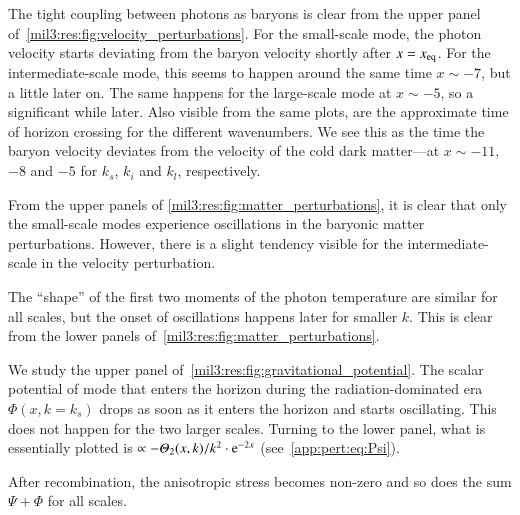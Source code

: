 





The tight coupling between photons as baryons is clear from the upper panel of~\cref{mil3:res:fig:velocity_perturbations}. For the small-scale mode, the photon velocity starts deviating from the baryon velocity shortly after $x=x_\mathrm{eq}$. For the intermediate-scale mode, this seems to happen around the same time $x\sim-7$, but a little later on. The same happens for the large-scale mode at $x\sim -5$, so a significant while later. Also visible from the same plots, are the approximate time of horizon crossing for the different wavenumbers. We see this as the time the baryon velocity deviates from the velocity of the cold dark matter---at $x\sim -11$, $-8$ and $-5$ for $k_s$, $k_i$ and $k_l$, respectively.

From the upper panels of \cref{mil3:res:fig:matter_perturbations}, it is clear that only the small-scale modes experience oscillations in the baryonic matter perturbations. However, there is a slight tendency visible for the intermediate-scale in the velocity perturbation.

The ``shape'' of the first two moments of the photon temperature are similar for all scales, but the onset of oscillations happens later for smaller $k$. This is clear from the lower panels of~\cref{mil3:res:fig:matter_perturbations}.

We study the upper panel of~\cref{mil3:res:fig:gravitational_potential}. The scalar potential of mode that enters the horizon during the radiation-dominated era $\Phi(x,k\!=\!k_s)$ drops as soon as it enters the horizon and starts oscillating. This does not happen for the two larger scales. Turning to the lower panel, what is essentially plotted is $\propto -\Theta_2(x, k)/k^2\cdot \eu[-2x]$ (see~\cref{app:pert:eq:Psi}). 

After recombination, the anisotropic stress becomes non-zero and so does the sum $\Psi + \Phi$ for all scales.


